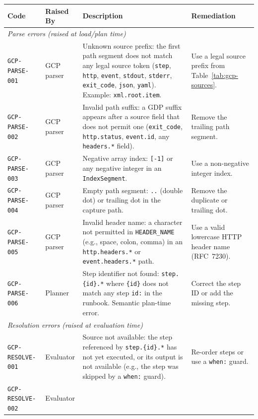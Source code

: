 \begin{table}[ht]
\centering
\begin{tabular}{p{3.8cm}p{2.0cm}p{4.8cm}p{2.4cm}}
\hline
\textbf{Code} & \textbf{Raised By} & \textbf{Description} & \textbf{Remediation} \\
\hline
\multicolumn{4}{l}{\textit{Parse errors (raised at load/plan time)}} \\
\hline
\texttt{GCP-PARSE-001}
  & GCP parser
  & Unknown source prefix: the first path segment does not match any legal source token (\texttt{step}, \texttt{http}, \texttt{event}, \texttt{stdout}, \texttt{stderr}, \texttt{exit\_code}, \texttt{json}, \texttt{yaml}).  Example: \texttt{xml.root.item}.
  & Use a legal source prefix from Table~\ref{tab:gcp-sources}. \\
\texttt{GCP-PARSE-002}
  & GCP parser
  & Invalid path suffix: a GDP suffix appears after a source field that does not permit one (\texttt{exit\_code}, \texttt{http.status}, \texttt{event.id}, any \texttt{headers.*} field).
  & Remove the trailing path segment. \\
\texttt{GCP-PARSE-003}
  & GCP parser
  & Negative array index: \texttt{[-1]} or any negative integer in an \texttt{IndexSegment}.
  & Use a non-negative integer index. \\
\texttt{GCP-PARSE-004}
  & GCP parser
  & Empty path segment: \texttt{..} (double dot) or trailing dot in the capture path.
  & Remove the duplicate or trailing dot. \\
\texttt{GCP-PARSE-005}
  & GCP parser
  & Invalid header name: a character not permitted in \texttt{HEADER\_NAME} (e.g., space, colon, comma) in an \texttt{http.headers.*} or \texttt{event.headers.*} path.
  & Use a valid lowercase HTTP header name (RFC~7230). \\
\texttt{GCP-PARSE-006}
  & Planner
  & Step identifier not found: \texttt{step.\{id\}.*} where \texttt{\{id\}} does not match any step \texttt{id:} in the runbook.  Semantic plan-time error.
  & Correct the step ID or add the missing step. \\
\hline
\multicolumn{4}{l}{\textit{Resolution errors (raised at evaluation time)}} \\
\hline
\texttt{GCP-RESOLVE-001}
  & Evaluator
  & Source not available: the step referenced by \texttt{step.\{id\}.*} has not yet executed, or its output is not available (e.g., the step was skipped by a \texttt{when:} guard).
  & Re-order steps or use a \texttt{when:} guard. \\
\texttt{GCP-RESOLVE-002}
  & Evaluator

\end{tabular}
\end{table}
